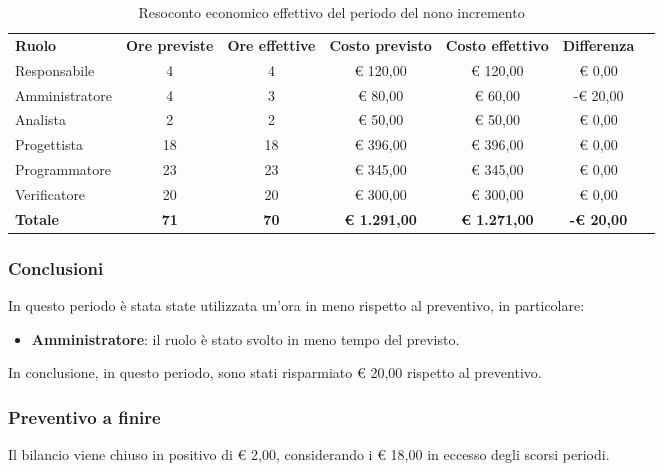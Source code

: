 \documentclass[../piano-di-progetto.tex]{subfiles}
\begin{document}
  \begin{table}[H]
    \centering
    \begin{tabular}{lcccccc}
      \rowcolor{lightgray}
      \textbf{Ruolo}  & \textbf{Ore previste} & \textbf{Ore effettive} & \textbf{Costo previsto} & \textbf{Costo effettivo} & \textbf{Differenza} \\
Responsabile    & 4           & 4           & € 120,00            & € 120,00            & € 0,00            \\
Amministratore  & 4           & 3           & € 80,00             & € 60,00             & -€ 20,00          \\
Analista        & 2           & 2           & € 50,00             & € 50,00             & € 0,00            \\
Progettista     & 18          & 18          & € 396,00            & € 396,00            & € 0,00            \\
Programmatore   & 23          & 23          & € 345,00            & € 345,00            & € 0,00            \\
Verificatore    & 20          & 20          & € 300,00            & € 300,00            & € 0,00            \\
\textbf{Totale} & \textbf{71} & \textbf{70} & \textbf{€ 1.291,00} & \textbf{€ 1.271,00} & \textbf{-€ 20,00}

    \end{tabular}
    \caption{Resoconto economico effettivo del periodo del nono incremento}
  \end{table}

\subsubsection{Conclusioni}
In questo periodo è stata state utilizzata un'ora in meno rispetto al preventivo, in particolare:
\begin{itemize}
    \item \textbf{Amministratore}: il ruolo è stato svolto in meno tempo del previsto.
\end{itemize}
In conclusione, in questo periodo, sono stati risparmiato € 20,00 rispetto al preventivo.

\subsubsection{Preventivo a finire}
Il bilancio viene chiuso in positivo di € 2,00, considerando i € 18,00 in eccesso degli scorsi periodi. 
\end{document}
